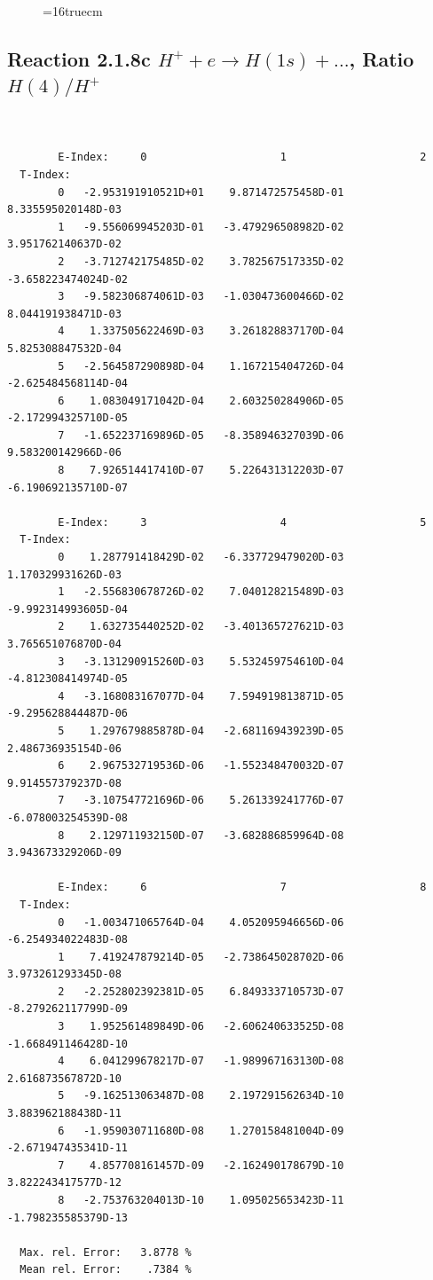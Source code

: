 \documentclass[12pt,dvips]{article}
\begin{document}
\begin{figure} \label{2.1.8rb}
\epsfxsize=16truecm
\end{figure}
\newpage



\subsection{
Reaction 2.1.8c  $H^+ + e \rightarrow H(1s) + ...$,  Ratio $H(4)/H^+$
}

\begin{small}\begin{verbatim}


        E-Index:     0                     1                     2
  T-Index:
        0   -2.953191910521D+01    9.871472575458D-01    8.335595020148D-03
        1   -9.556069945203D-01   -3.479296508982D-02    3.951762140637D-02
        2   -3.712742175485D-02    3.782567517335D-02   -3.658223474024D-02
        3   -9.582306874061D-03   -1.030473600466D-02    8.044191938471D-03
        4    1.337505622469D-03    3.261828837170D-04    5.825308847532D-04
        5   -2.564587290898D-04    1.167215404726D-04   -2.625484568114D-04
        6    1.083049171042D-04    2.603250284906D-05   -2.172994325710D-05
        7   -1.652237169896D-05   -8.358946327039D-06    9.583200142966D-06
        8    7.926514417410D-07    5.226431312203D-07   -6.190692135710D-07

        E-Index:     3                     4                     5
  T-Index:
        0    1.287791418429D-02   -6.337729479020D-03    1.170329931626D-03
        1   -2.556830678726D-02    7.040128215489D-03   -9.992314993605D-04
        2    1.632735440252D-02   -3.401365727621D-03    3.765651076870D-04
        3   -3.131290915260D-03    5.532459754610D-04   -4.812308414974D-05
        4   -3.168083167077D-04    7.594919813871D-05   -9.295628844487D-06
        5    1.297679885878D-04   -2.681169439239D-05    2.486736935154D-06
        6    2.967532719536D-06   -1.552348470032D-07    9.914557379237D-08
        7   -3.107547721696D-06    5.261339241776D-07   -6.078003254539D-08
        8    2.129711932150D-07   -3.682886859964D-08    3.943673329206D-09

        E-Index:     6                     7                     8
  T-Index:
        0   -1.003471065764D-04    4.052095946656D-06   -6.254934022483D-08
        1    7.419247879214D-05   -2.738645028702D-06    3.973261293345D-08
        2   -2.252802392381D-05    6.849333710573D-07   -8.279262117799D-09
        3    1.952561489849D-06   -2.606240633525D-08   -1.668491146428D-10
        4    6.041299678217D-07   -1.989967163130D-08    2.616873567872D-10
        5   -9.162513063487D-08    2.197291562634D-10    3.883962188438D-11
        6   -1.959030711680D-08    1.270158481004D-09   -2.671947435341D-11
        7    4.857708161457D-09   -2.162490178679D-10    3.822243417577D-12
        8   -2.753763204013D-10    1.095025653423D-11   -1.798235585379D-13

  Max. rel. Error:   3.8778 %
  Mean rel. Error:    .7384 %


\end{verbatim}\end{small}
\end{document}
